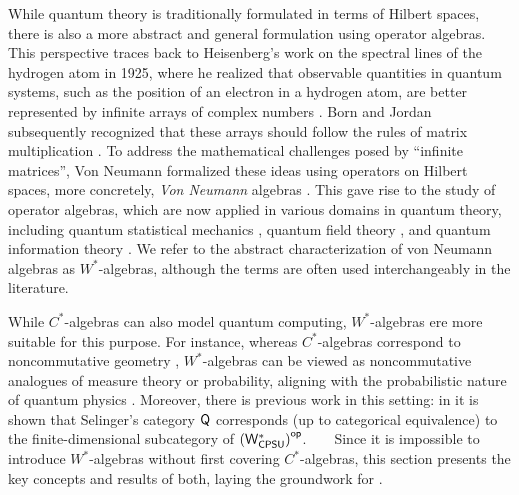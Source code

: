  While quantum theory is traditionally formulated in terms of Hilbert spaces, there is also a more abstract and general formulation using operator algebras. This perspective traces back to Heisenberg’s work on the spectral lines of the hydrogen atom in 1925, where he realized that observable quantities in quantum systems, such as the position of an electron in a hydrogen atom, are better represented by infinite arrays of complex numbers \cite{heisenbergUeberQuantentheoretischeUmdeutung1925}. Born and Jordan subsequently recognized that these arrays should follow the rules of matrix multiplication \cite{bornZurQuantenmechanik1925}. To address the mathematical challenges posed by ``infinite matrices'', Von Neumann formalized these ideas using operators on Hilbert spaces, more concretely, \emph{Von Neumann} algebras \cite{neumann1927wahrscheinlichkeitstheoretischer}. This gave rise to the study of operator algebras, which are now applied in various domains in quantum theory, including quantum statistical mechanics \cite{bratteliOperatorAlgebrasQuantum1987}, quantum field theory \cite{arakiMathematicalTheoryQuantum1999,haagAlgebraicApproachQuantum1964}, and quantum information theory \cite{keylFundamentalsQuantumInformation2002}. We refer to the abstract characterization of von Neumann algebras as $W^*$-algebras, although the terms are often used interchangeably in the literature.


 While $C^*$-algebras can also model quantum computing, $W^*$-algebras ere more suitable for this purpose. For instance, whereas $C^*$-algebras correspond to noncommutative geometry \cite{connesNoncommutativeGeometry1995}, $W^*$-algebras can be viewed as noncommutative analogues of measure theory or probability, aligning with the probabilistic nature of quantum physics \cite{hamhalterQuantumMeasureTheory2003,HansQuantumProbabilityQuantumInformationTheory10}. Moreover, there is previous work in this setting: in \cite{choSemanticsQuantumProgramming2016} it is shown that Selinger’s category $\mathsf{Q}$ corresponds (up to categorical equivalence) to the finite-dimensional subcategory of $\left(\mathsf{W^*_{CPSU}}\right)^{\mathsf{op}}$.
  
  
Since it is impossible to introduce \( W^* \)-algebras without first covering \( C^* \)-algebras, this section presents the key concepts and results of both, laying the groundwork for .

